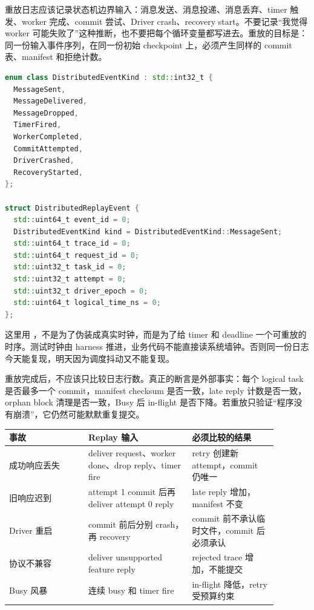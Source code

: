 重放日志应该记录状态机边界输入：消息发送、消息投递、消息丢弃、timer 触发、worker 完成、commit 尝试、Driver crash、recovery start。不要记录“我觉得 worker 可能失败了”这种推断，也不要把每个循环变量都写进去。重放的目标是：同一份输入事件序列，在同一份初始 checkpoint 上，必须产生同样的 commit 表、manifest 和拒绝计数。

\begin{lstlisting}[language=C++,caption={可重放事件的示例形态}]
enum class DistributedEventKind : std::int32_t {
  MessageSent,
  MessageDelivered,
  MessageDropped,
  TimerFired,
  WorkerCompleted,
  CommitAttempted,
  DriverCrashed,
  RecoveryStarted,
};

struct DistributedReplayEvent {
  std::uint64_t event_id = 0;
  DistributedEventKind kind = DistributedEventKind::MessageSent;
  std::uint64_t trace_id = 0;
  std::uint64_t request_id = 0;
  std::uint32_t task_id = 0;
  std::uint32_t attempt = 0;
  std::uint32_t driver_epoch = 0;
  std::uint64_t logical_time_ns = 0;
};
\end{lstlisting}

这里用 ，不是为了伪装成真实时钟，而是为了给 timer 和 deadline 一个可重放的时序。测试时钟由 harness 推进，业务代码不能直接读系统墙钟。否则同一份日志今天能复现，明天因为调度抖动又不能复现。

重放完成后，不应该只比较日志行数。真正的断言是外部事实：每个 logical task 是否最多一个 commit，manifest checksum 是否一致，late reply 计数是否一致，orphan block 清理是否一致，Busy 后 in-flight 是否下降。若重放只验证“程序没有崩溃”，它仍然可能默默重复提交。

\begin{center}
\begin{tabular}{p{0.26\linewidth}p{0.34\linewidth}p{0.28\linewidth}}
\toprule
事故 & Replay 输入 & 必须比较的结果 \\
\midrule
成功响应丢失 & deliver request、worker done、drop reply、timer fire & retry 创建新 attempt，commit 仍唯一 \\
旧响应迟到 & attempt 1 commit 后再 deliver attempt 0 reply & late reply 增加，manifest 不变 \\
Driver 重启 & commit 前后分别 crash，再 recovery & commit 前不承认临时文件，commit 后必须承认 \\
协议不兼容 & deliver unsupported feature reply & rejected trace 增加，不能提交 \\
Busy 风暴 & 连续 busy 和 timer fire & in-flight 降低，retry 受预算约束 \\
\bottomrule
\end{tabular}
\end{center}

